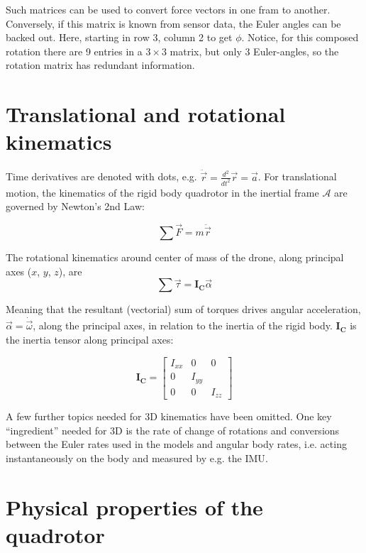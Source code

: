 \documentclass[a4paper]{report}
\newcommand{\matr}[1]{\mathbf{#1}}
\begin{document}
Such matrices can be used to convert force vectors in one fram to another. Conversely, if this matrix is known from sensor data, the Euler angles can be backed out. Here, starting in row 3, column 2 to get $\phi$. Notice, for this composed rotation there are 9 entries in a $3 \times 3$ matrix, but only 3 Euler-angles, so the rotation matrix has redundant information.

\section{Translational and rotational kinematics}

Time derivatives are denoted with dots, e.g. $\ddot{\vec{r}}=\frac{d^2}{dt^2}\vec{r}=\vec{a}$. 
For translational motion, the kinematics of the rigid body quadrotor in the inertial frame $\mathcal{A}$ are governed by Newton's 2nd Law:

\begin{equation}\label{eq:N2}
\sum \vec{F} = m \ddot{\vec{r}}
\end{equation}

The rotational kinematics around center of mass of the drone, along principal axes ($x$, $y$, $z$), are 
\begin{equation}\label{eq:rot_kinematics}
\sum \vec{\tau} = \matr{I_C} \vec{\alpha}
\end{equation}

Meaning that the resultant (vectorial) sum of torques drives angular acceleration, $\vec{\alpha}=\dot{\vec{\omega}}$, along the principal axes, in relation to the inertia of the rigid body. $\matr{I_C}$ is the inertia tensor along principal axes:

\begin{equation}
\matr{I_C} = 
\begin{bmatrix}
I_{xx} & 0 & 0\\
0 & I_{yy} & \\
0 & 0 & I_{zz}
\end{bmatrix}
\end{equation}

A few further topics needed for 3D kinematics have been omitted. One key ``ingredient'' needed for 3D is the rate of change of rotations and conversions between the Euler rates used in the models and angular body rates, i.e. acting instantaneously on the body and measured by e.g. the \gls{IMU}.

\section{Physical properties of the quadrotor}
\end{document}
